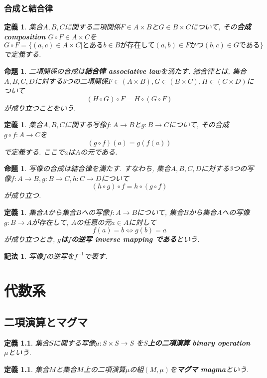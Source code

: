 \documentclass[dvipdfmx]{jsbook}
\theoremstyle{plain}
\newtheorem{Def}[thm]{定義}
\newtheorem{Notation}[thm]{記法}
\newtheorem{Prop}[thm]{命題}
\begin{document}
\subsection{合成と結合律}
\begin{Def}
集合$A,B,C$に関する二項関係$F\in A\times B$と$G\in B\times C$について, その{\bf 合成 composition} $G\circ F\in A\times C$を
\[
G\circ F=\{(a,c)\in A\times C|\text{とある}b\in B\text{が存在して}(a,b)\in F \text{かつ} (b,c)\in G\text{である}\}
\]
で定義する.
\end{Def}
\begin{Prop}
二項関係の合成は{\bf 結合律 associative law}を満たす.
結合律とは, 集合$A,B,C,D$に対する3つの二項関係$F\in(A\times B),G\in(B\times C),H\in(C\times D)$について
\[
(H\circ G)\circ F=H\circ (G\circ F)
\]
が成り立つことをいう.
\end{Prop}

\begin{Def}
集合$A,B,C$に関する写像$f:A\rightarrow B$と$g:B\rightarrow C$について, その合成 $g\circ f:A\rightarrow C$を
\[
(g\circ f)(a)=g(f(a))
\]
で定義する. ここで$a$は$A$の元である.
\end{Def}
\begin{Prop}
写像の合成は結合律を満たす.
すなわち, 集合$A,B,C,D$に対する3つの写像$f:A\rightarrow B, g:B\rightarrow C,
h:C\rightarrow D$について
\[
(h\circ g)\circ f=h\circ(g\circ f)
\]
が成り立つ.
\end{Prop}

\begin{Def}
集合$A$から集合$B$への写像$f:A\rightarrow B$について, 集合$B$から集合$A$への写像$g:B\rightarrow A$が存在して, $A$の任意の元$a\in A$に対して
\[
f(a)=b \Leftrightarrow g(b)=a
\]
が成り立つとき, {\bf $g$は$f$の逆写 inverse mapping である}という.
\end{Def}
\begin{Notation}
写像$f$の逆写を$f^{-1}$で表す.
\end{Notation}



\chapter{代数系}
\section{二項演算とマグマ}
\begin{Def}
集合$S$に関する写像$\mu:S\times S\rightarrow S$
を{\bf $S$上の二項演算 binary operation $\mu$}という.
\end{Def}
\begin{Def}
集合$M$と集合$M$上の二項演算$\mu$の組$(M,\mu)$を{\bf マグマ magma}という.
\end{Def}
\end{document}
